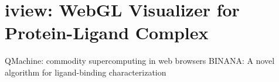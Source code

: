 \chapter{iview: WebGL Visualizer for Protein-Ligand Complex}

\citep{1405} QMachine: commodity supercomputing in web browsers
\citep{1413} BINANA: A novel algorithm for ligand-binding characterization

\chapterend
